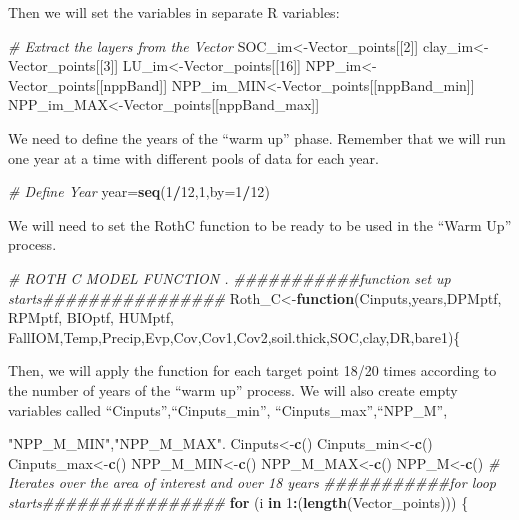 \documentclass[
  10pt,
  b5paper,
]{book}
\newenvironment{Shaded}{\begin{snugshade}}{\end{snugshade}}
\newcommand{\CommentTok}[1]{\textcolor[rgb]{0.56,0.35,0.01}{\textit{#1}}}
\newcommand{\ControlFlowTok}[1]{\textcolor[rgb]{0.13,0.29,0.53}{\textbf{#1}}}
\newcommand{\DataTypeTok}[1]{\textcolor[rgb]{0.13,0.29,0.53}{#1}}
\newcommand{\DecValTok}[1]{\textcolor[rgb]{0.00,0.00,0.81}{#1}}
\newcommand{\KeywordTok}[1]{\textcolor[rgb]{0.13,0.29,0.53}{\textbf{#1}}}
\newcommand{\NormalTok}[1]{#1}
\newcommand{\OperatorTok}[1]{\textcolor[rgb]{0.81,0.36,0.00}{\textbf{#1}}}
\newcommand{\StringTok}[1]{\textcolor[rgb]{0.31,0.60,0.02}{#1}}
\begin{document}
Then we will set the variables in separate R variables:

\begin{Shaded}
\begin{Highlighting}[]
\CommentTok{# Extract the layers from the Vector}
\NormalTok{SOC_im<-Vector_points[[}\DecValTok{2}\NormalTok{]] }
\NormalTok{clay_im<-Vector_points[[}\DecValTok{3}\NormalTok{]] }
\NormalTok{LU_im<-Vector_points[[}\DecValTok{16}\NormalTok{]]}
\NormalTok{NPP_im<-Vector_points[[nppBand]]}
\NormalTok{NPP_im_MIN<-Vector_points[[nppBand_min]]}
\NormalTok{NPP_im_MAX<-Vector_points[[nppBand_max]]}
\end{Highlighting}
\end{Shaded}

We need to define the years of the ``warm up'' phase. Remember that we will run one year at a time with different pools of data for each year.

\begin{Shaded}
\begin{Highlighting}[]
\CommentTok{# Define Year }
\NormalTok{year=}\KeywordTok{seq}\NormalTok{(}\DecValTok{1}\OperatorTok{/}\DecValTok{12}\NormalTok{,}\DecValTok{1}\NormalTok{,}\DataTypeTok{by=}\DecValTok{1}\OperatorTok{/}\DecValTok{12}\NormalTok{)}
\end{Highlighting}
\end{Shaded}

We will need to set the RothC function to be ready to be used in the ``Warm Up'' process.

\begin{Shaded}
\begin{Highlighting}[]
\CommentTok{# ROTH C MODEL FUNCTION . }
\CommentTok{###########function set up starts################}
\NormalTok{Roth_C<-}\ControlFlowTok{function}\NormalTok{(Cinputs,years,DPMptf, RPMptf, BIOptf, HUMptf, FallIOM,Temp,Precip,Evp,Cov,Cov1,Cov2,soil.thick,SOC,clay,DR,bare1)\{}
\end{Highlighting}
\end{Shaded}

Then, we will apply the function for each target point 18/20 times according to the number of years of the ``warm up'' process. We will also create empty variables called ``Cinputs'',``Cinputs\_min'', ``Cinputs\_max'',``NPP\_M'',

\begin{Shaded}
\begin{Highlighting}[]
\StringTok{"NPP_M_MIN"}\NormalTok{,}\StringTok{"NPP_M_MAX"}\NormalTok{.}
\NormalTok{Cinputs<-}\KeywordTok{c}\NormalTok{()}
\NormalTok{Cinputs_min<-}\KeywordTok{c}\NormalTok{()}
\NormalTok{Cinputs_max<-}\KeywordTok{c}\NormalTok{()}
\NormalTok{NPP_M_MIN<-}\KeywordTok{c}\NormalTok{()}
\NormalTok{NPP_M_MAX<-}\KeywordTok{c}\NormalTok{()}
\NormalTok{NPP_M<-}\KeywordTok{c}\NormalTok{()}
\CommentTok{# Iterates over the area of interest and over 18 years }
\CommentTok{###########for loop starts################}
\ControlFlowTok{for}\NormalTok{ (i }\ControlFlowTok{in} \DecValTok{1}\OperatorTok{:}\NormalTok{(}\KeywordTok{length}\NormalTok{(Vector_points))) \{}
\end{Highlighting}
\end{Shaded}
\end{document}
